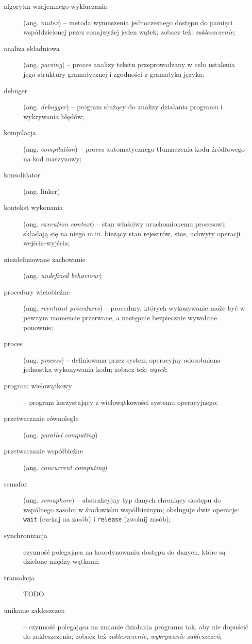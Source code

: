 \documentclass[12pt]{article}
\begin{document}
\begin{description}
    \item[algorytm wzajemnego wykluczania] (ang. \emph{mutex}) -- metoda wymuszenia jednoczesnego dostępu do pamięci współdzielonej przez conajwyżej jeden wątek; zobacz też: \emph{zakleszczenie};
    \item[analiza składniowa] (ang. \emph{parsing}) -- proces analizy tekstu przeprowadzany w celu ustalenia jego struktury gramatycznej i zgodności z gramatyką języka;
    \item[debuger] (ang. \emph{debugger}) -- program służący do analizy działania programu i wykrywania błędów;
    \item[kompilacja] (ang. \emph{compilation}) -- proces automatycznego tłumaczenia kodu źródłowego na kod maszynowy;
    \item[konsolidator] (ang. linker)
    \item[kontekst wykonania] (ang. \emph{execution context}) -- stan właściwy uruchomionemu procesowi; składają się na niego m.in. bieżący stan rejestrów, stos, uchwyty operacji wejścia-wyjścia;
    \item[niezdefiniowane zachowanie] (ang. \emph{undefined behaviour})
    \item[procedury wielobieżne] (ang. \emph{reentrant procedures}) -- procedury, których wykonywanie może być w pewnym momencie przerwane, a następnie bezpiecznie wywołane ponownie;
    \item[proces] (ang. \emph{process}) -- definiowana przez system operacyjny odosobniona jednostka wykonywania kodu; zobacz też: \emph{wątek};
    \item[program wielowątkowy] -- program korzystający z wielowątkowości systemu operacyjnego;
    \item[przetwarzanie równoległe] (ang. \emph{parallel computing})
    \item[przetwarzanie współbieżne] (ang. \emph{concurrent computing})
    \item[semafor] (ang. \emph{semaphore}) -- abstrakcyjny typ danych chroniący dostępu do wspólnego zasobu w środowisku współbieżnym; obsługuje dwie operacje: \texttt{wait} (czekaj na zasób) i \texttt{release} (zwolnij zasób);
    \item[synchronizacja] czynność polegająca na koordynowaniu dostępu do danych, które są dzielone między wątkami;
    \item[transakcja] TODO
    \item[unikanie zakleszczen] -- czynność polegająca na zmianie działania programu tak, aby nie dopuścić do zakleszczenia; zobacz też \emph{zakleszczenie}, \emph{wykrywanie zakleszczeń};

\end{description}
\end{document}
